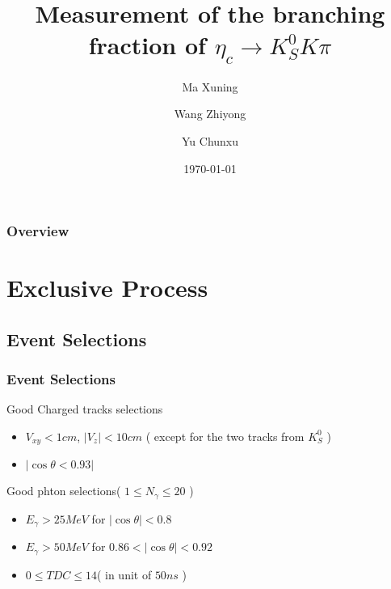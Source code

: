 \documentclass{beamer}
\title[Measurement of Branching fraction]{Measurement of the branching fraction of $\eta_c\to K_S^0 K \pi$} %
\author{Ma Xuning \inst{1} \and Wang Zhiyong\inst{2} \and Yu Chunxu \inst{1}} %
\institute[]{\inst{1} Nankai Univ. \and \inst{2} IHEP}
\date{\today} %
\begin{document}
\begin{frame}
\titlepage %
\end{frame}

\begin{frame}
\frametitle{Overview} %
\tableofcontents %
\end{frame}


\section{Exclusive Process} %
\subsection{Event Selections}

\begin{frame}
\frametitle{Event Selections}
\begin{block}{Good Charged tracks selections}
\begin{itemize}
\item $V_{xy} < 1 cm$, $ | V_z | < 10 cm$ ( except for the two tracks from $K_S^0$ )
\item $|\cos\theta < 0.93 |$
\end{itemize}
\end{block}
\begin{block}{Good phton selections( $1\leq N_{\gamma}\leq 20$ )}
\begin{itemize}
\item $E_{\gamma} > 25 MeV$ for $|\cos\theta| < 0.8$
\item $E_{\gamma} > 50 MeV$ for $0.86<|\cos\theta|<0.92$
\item $0\leq TDC\leq 14 $( in unit of $50ns$ )
\end{itemize}
\end{block}
\bigskip
\end{frame}
\end{document}
